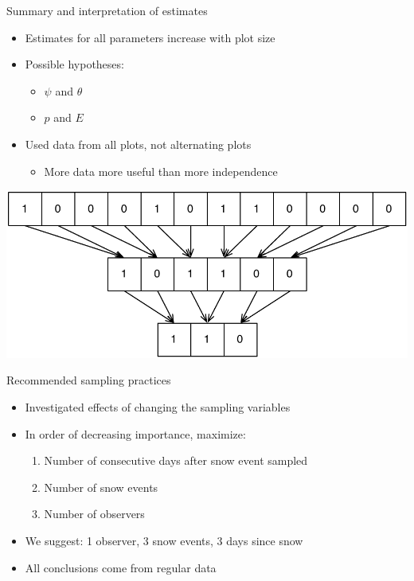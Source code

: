 \documentclass{beamer}
\begin{document}

\begin{frame}{Summary and interpretation of estimates}
	\begin{itemize}
		\item Estimates for all parameters increase with plot size
		\item Possible hypotheses:
		\begin{itemize}
			\item \(\psi\) and \(\theta\)
			\item \(p\) and \(E\)
		\end{itemize}
		\item Used data from all plots, not alternating plots
		\begin{itemize}
			\item More data more useful than more independence
		\end{itemize}
	\end{itemize}
	\begin{center}
		\includegraphics[scale=0.5]{Aggregation.pdf}
	\end{center}
\end{frame}

\begin{frame}{Recommended sampling practices}
	\begin{itemize}
		\item Investigated effects of changing the sampling variables
		\item In order of decreasing importance, maximize:
		\begin{enumerate}
			\item Number of consecutive days after snow event sampled
			\item Number of snow events
			\item Number of observers
		\end{enumerate}
		\item We suggest: 1 observer, 3 snow events, 3 days since snow
		\item All conclusions come from regular data
	\end{itemize}
\end{frame}
\end{document}
